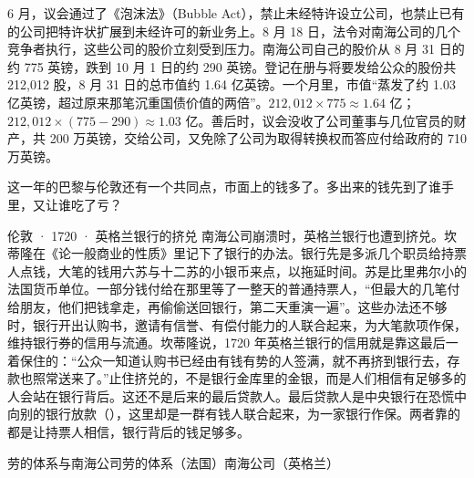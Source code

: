 6 月，议会通过了《泡沫法》（Bubble Act），禁止未经特许设立公司，也禁止已有的公司把特许状扩展到未经许可的新业务上。8 月 18 日，法令对南海公司的几个竞争者执行，这些公司的股价立刻受到压力\cite{garber1990}。南海公司自己的股价从 8 月 31 日的约 775 英镑，跌到 10 月 1 日的约 290 英镑。登记在册与将要发给公众的股份共 212,012 股，8 月 31 日的总市值约 1.64 亿英镑。一个月里，市值“蒸发了约 1.03 亿英镑，超过原来那笔沉重国债价值的两倍”\cite{garber1990}。$212{,}012\times775\approx1.64$ 亿；$212{,}012\times(775-290)\approx1.03$ 亿。善后时，议会没收了公司董事与几位官员的财产，共 200 万英镑，交给公司，又免除了公司为取得转换权而答应付给政府的 710 万英镑\cite{garber1990}。

这一年的巴黎与伦敦还有一个共同点，市面上的钱多了。多出来的钱先到了谁手里，又让谁吃了亏？

\begin{case}{伦敦 · 1720 · 英格兰银行的挤兑}
南海公司崩溃时，英格兰银行也遭到挤兑。坎蒂隆在《论一般商业的性质》里记下了银行的办法\cite{cantillon1755}。银行先是多派几个职员给持票人点钱，大笔的钱用六苏与十二苏的小银币来点，以拖延时间。苏是比里弗尔小的法国货币单位。一部分钱付给在那里等了一整天的普通持票人，“但最大的几笔付给朋友，他们把钱拿走，再偷偷送回银行，第二天重演一遍”。这些办法还不够时，银行开出认购书，邀请有信誉、有偿付能力的人联合起来，为大笔款项作保，维持银行券的信用与流通。坎蒂隆说，1720 年英格兰银行的信用就是靠这最后一着保住的：“公众一知道认购书已经由有钱有势的人签满，就不再挤到银行去，存款也照常送来了。”\cite{cantillon1755}止住挤兑的，不是银行金库里的金银，而是人们相信有足够多的人会站在银行背后。这还不是后来的最后贷款人。最后贷款人是中央银行在恐慌中向别的银行放款（），这里却是一群有钱人联合起来，为一家银行作保。两者靠的都是让持票人相信，银行背后的钱足够多。
\end{case}

\begin{compare}{劳的体系与南海公司}{劳的体系（法国）}{南海公司（英格兰）}
\end{compare}

